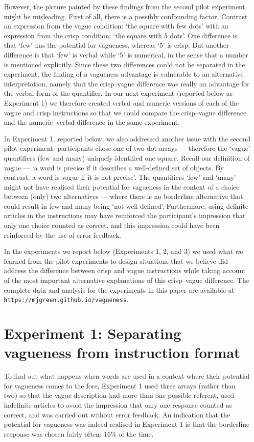 \documentclass[ %
  graybox       %
 ,envcountchap  %
 ,sectrefs      %
]{svmono}
\begin{document}
However, the picture painted by these findings from the second pilot experiment might be misleading. First of all, there is a possibly confounding factor. Contrast an expression from the vague condition: `the square with few dots' with an expression from the crisp condition: `the square with 5 dots'. One difference is that `few' has the potential for vagueness, whereas `5' is crisp. But another difference is that `few' is verbal while `5' is numerical, in the sense that a number is mentioned explicitly. Since these two differences could not be separated in the experiment, the finding of a vagueness advantage is vulnerable to an alternative interpretation, namely that the crisp--vague difference was really an advantage for the verbal form of the quantifier. In our next experiment (reported below as Experiment 1) we therefore created verbal and numeric versions of each of the vague and crisp instructions so that we could compare the crisp--vague difference and the numeric--verbal difference in the same experiment.

In Experiment 1, reported below, we also addressed another issue with the second pilot experiment: participants chose one of two dot arrays --- therefore the `vague' quantifiers (few and many) uniquely identified one square. Recall our definition of vague --- `a word is precise if it describes a well-defined set of objects. By contrast, a word is vague if it is not precise'. The quantifiers `few' and `many' might not have realised their potential for vagueness in the context of a choice between (only) two alternatives --- where there is no borderline alternative that could result in few and many being `not well-defined'. Furthermore, using definite articles in the instructions may have reinforced the participant's impression that only one choice counted as correct, and this impression could have been reinforced by the use of error feedback.

In the experiments we report below (Experiments 1, 2, and 3) we used what we learned from the pilot experiments to design situations that we believe did address the difference between crisp and vague instructions while taking account of the most important alternative explanations of this crisp--vague difference. The complete data and analysis for the experiments in this paper are available at \texttt{https://mjgreen.github.io/vagueness}.

\section{Experiment 1: Separating vagueness from instruction format}
To find out what happens when words are used in a context where their potential for vagueness comes to the fore, Experiment 1 used three arrays (rather than two) so that the vague description had more than one possible referent, used indefinite articles to avoid the impression that only one response counted as correct, and was carried out without error feedback. An indication that the potential for vagueness was indeed realised in Experiment 1 is that the borderline response was chosen fairly often: 16\% of the time.
\end{document}
